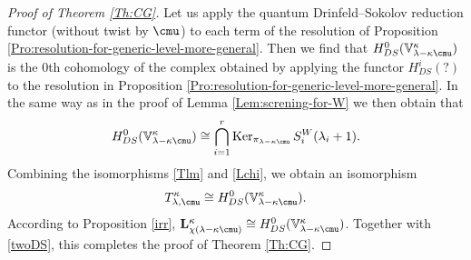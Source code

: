 \documentclass{amsart}
\newcommand{\V}{\mathbb{V}}
\newcommand{\on}{\operatorname}
\newcommand{\+}{\mathop{\oplus}}
\renewcommand{\*}{{\otimes}}
\newcommand{\ra}{\rightarrow}
\newcommand{\lam}{\lambda}
\theoremstyle{theorem}
\theoremstyle{remark}
\numberwithin{equation}{section}
\begin{document}
\begin{proof}[Proof of Theorem  \ref{Th:CG}]
Let us apply the quantum Drinfeld--Sokolov
reduction functor (without twist by $\cmu$) to each term of the
resolution of Proposition
\ref{Pro:resolution-for-generic-level-more-general}. Then we find that
$H_{DS}^0(\V_{\lam-\kappa \cmu}^\kappa)$ is the 0th cohomology of the
complex obtained by applying the functor $H^i_{DS}(?)$ to the
resolution in Proposition
\ref{Pro:resolution-for-generic-level-more-general}. In the same way
as in the proof of Lemma \ref{Lem:screning-for-W} 
we then obtain that
\begin{equation}    \label{Lchi}
H_{DS}^0(\V_{\lam-\kappa \cmu}^\kappa)
\cong \bigcap_{i=1}^r \on{Ker}_{\pi_{\lam-\kappa\cmu}}
S_i^W(\lam_i+1).
\end{equation}
Combining the isomorphisms \eqref{Tlm} and \eqref{Lchi}, we obtain an
isomorphism
\begin{equation}    \label{twoDS}
T^\kappa_{\lam,\cmu} \cong H_{DS}^0(\V_{\lam-\kappa \cmu}^\kappa).
\end{equation}
According to Proposition \ref{irr},
$\mathbf{L}_{\chi(\lam-\kappa\cmu)}^\kappa\cong
H_{DS}^0(\V_{\lam-\kappa \cmu}^\kappa)$. Together with \eqref{twoDS},
this completes the proof of Theorem \ref{Th:CG}.
%
\end{proof}
\end{document}
